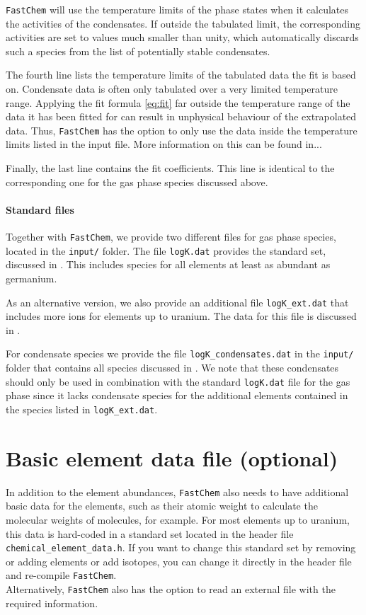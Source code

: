 \documentclass[numbers=noenddot]{aux/fcmanual}
\newcommand{\fc}{\texttt{FastChem}\xspace}
\begin{document}
\fc will use the temperature limits of the phase states when it calculates the activities of the condensates. If outside the tabulated limit, the corresponding activities are set to values much smaller than unity, which automatically discards such a species from the list of potentially stable condensates. 

The fourth line lists the temperature limits of the tabulated data the fit is based on. Condensate data is often only tabulated over a very limited temperature range. Applying the fit formula \eqref{eq:fit} far outside the temperature range of the data it has been fitted for can result in unphysical behaviour of the extrapolated data. Thus, \fc has the option to only use the data inside the temperature limits listed in the input file. More information on this can be found in...

Finally, the last line contains the fit coefficients. This line is identical to the corresponding one for the gas phase species discussed above.


\paragraph{Standard files}
Together with \fc, we provide two different files for gas phase species, located in the \verb|input/| folder. The file \verb|logK.dat| provides the standard set, discussed in \citet{Stock2018MNRAS.479..865S}. This includes species for all elements at least as abundant as germanium.

As an alternative version, we also provide an additional file \verb|logK_ext.dat| that includes more ions for elements up to uranium. The data for this file is discussed in \citet{Hoeijmakers2019A&A...627A.165H}.

For condensate species we provide the file \verb|logK_condensates.dat| in the \verb|input/| folder that contains all species discussed in \citet{Kitzmann2023inprep}. We note that these condensates should only be used in combination with the standard \verb|logK.dat| file for the gas phase since it lacks condensate species for the additional elements contained in the species listed in \verb|logK_ext.dat|.


\newpage
\section{Basic element data file (optional)}
In addition to the element abundances, \fc also needs to have additional basic data for the elements, such as their atomic weight to calculate the molecular weights of molecules, for example. For most elements up to uranium, this data is hard-coded in a standard set located in the header file \verb|chemical_element_data.h|. If you want to change this standard set by removing or adding elements or add isotopes, you can change it directly in the header file and re-compile \fc.\\
Alternatively, \fc also has the option to read an external file with the required information.
\end{document}
